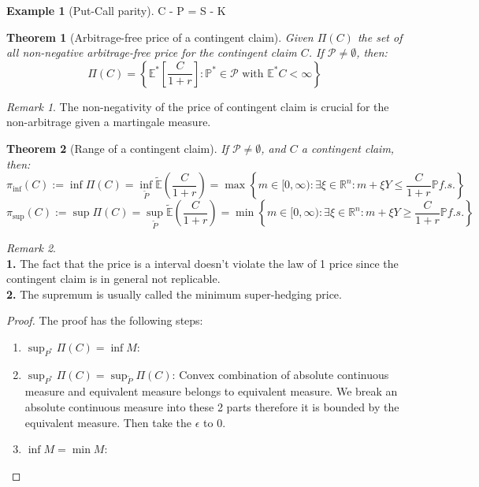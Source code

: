 \documentclass[a4paper,11pt]{book}
\newtheorem{theorem}{Theorem}[section]
\theoremstyle{definition}
\newtheorem*{example}{Example}
\theoremstyle{remark}
\newtheorem*{remark}{Remark}
\begin{document}
\begin{example}[Put-Call parity]
	C - P = S - K
\end{example}

\begin{theorem}[Arbitrage-free price of a contingent claim]
	Given $\Pi(C)$ the set of all non-negative arbitrage-free price for the contingent claim $C$. If $\mathcal{P} \neq \emptyset$, then:
	\begin{equation*}
		\Pi(C) = \left\{ \mathbb{E}^*\left[\frac{C}{1+r}\right] :  \mathbb{P}^* \in \mathcal{P} \text{ with } \mathbb{E}^*C < \infty \right\}
	\end{equation*}
\end{theorem}
\begin{remark}
The non-negativity of the price of contingent claim is crucial for the non-arbitrage given a martingale measure.\\
\end{remark}

\begin{theorem}[Range of a contingent claim]
	If $\mathcal{P} \neq \emptyset$, and $C$ a contingent claim, then:
	\begin{equation*}
		\pi_{\inf}(C):= \inf \Pi(C) = \inf_{\tilde{P}}\tilde{\mathbb{E}}(\frac{C}{1+r}) = \max \left\{ m \in [0, \infty): \exists \xi \in \mathbb{R}^n:  m +   \xi Y \leq \frac{C}{1 + r} \mathbb{P} f.s. \right\}
	\end{equation*}
	\begin{equation*}
		\pi_{\sup}(C) := \sup \Pi(C) = \sup_{\tilde{P}}\tilde{\mathbb{E}}(\frac{C}{1+r}) = \min \left\{ m \in [0, \infty) : \exists \xi \in \mathbb{R}^n: m + \xi Y \geq \frac{C}{1 + r} \mathbb{P} f.s. \right\} 
	\end{equation*}
\end{theorem}
\begin{remark}\quad\\
\textbf{1.} The fact that the price is a interval doesn't violate the law of 1 price since the contingent claim is in general not replicable. \\
\textbf{2. }The supremum is usually called the minimum super-hedging price. 	
\end{remark}
\begin{proof}
	The proof has the following steps:
	\begin{enumerate}
		\item $\sup_{P^*}\Pi(C) = \inf M$:
		\item $\sup_{P^*}\Pi(C) = \sup_{\tilde{P}}\Pi(C)$: Convex combination of absolute continuous measure and equivalent measure belongs to equivalent measure. We break an absolute continuous measure into these 2 parts therefore it is bounded by the equivalent measure. Then take the $\epsilon$ to 0.  
		\item $\inf M = \min M$:
	\end{enumerate}
\end{proof}
\end{document}
